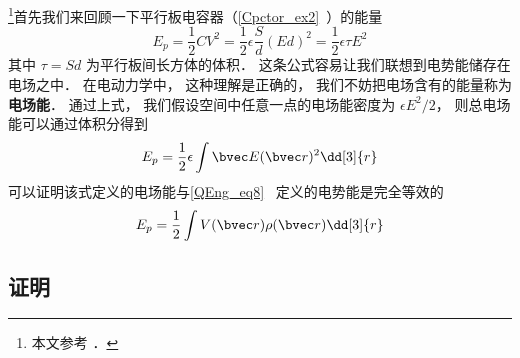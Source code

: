 
\begin{issues}
\issueDraft
\end{issues}


\footnote{本文参考 \cite{GriffE}．}首先我们来回顾一下平行板电容器（\autoref{Cpctor_ex2}~）的能量
\begin{equation}
E_p = \frac12 CV^2 = \frac12 \epsilon \frac Sd (Ed)^2 = \frac 12 \epsilon \tau E^2
\end{equation}
其中 $\tau = Sd$ 为平行板间长方体的体积． 这条公式容易让我们联想到电势能储存在电场之中． 在电动力学中， 这种理解是正确的， 我们不妨把电场含有的能量称为\textbf{电场能}． 通过上式， 我们假设空间中任意一点的电场能密度为 $\epsilon E^2/2$， 则总电场能可以通过体积分得到
\begin{equation}
E_p = \frac12 \epsilon \int \bvec E(\bvec r)^2 \dd[3]{r}
\end{equation}
可以证明该式定义的电场能与\autoref{QEng_eq8}~ 定义的电势能是完全等效的
\begin{equation}
E_p = \frac 12 \int V(\bvec r) \rho(\bvec r) \dd[3]{r}
\end{equation}

\subsection{证明}
